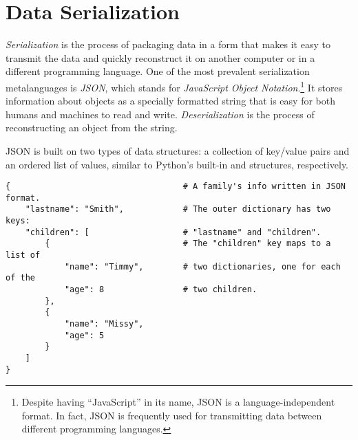 
\section*{Data Serialization} %

\emph{Serialization} is the process of packaging data in a form that makes it easy to transmit the data and quickly reconstruct it on another computer or in a different programming language.
One of the most prevalent serialization metalanguages is \emph{JSON}, which stands for \emph{JavaScript Object Notation}.\footnote{Despite having ``JavaScript'' in its name, JSON is a language-independent format. In fact, JSON is frequently used for transmitting data between different programming languages.}
It stores information about objects as a specially formatted string that is easy for both humans and machines to read and write.
\emph{Deserialization} is the process of reconstructing an object from the string.

JSON is built on two types of data structures: a collection of key/value pairs and an ordered list of values, similar to Python's built-in  and  structures, respectively.
%
\begin{lstlisting}
{                                   # A family's info written in JSON format.
    "lastname": "Smith",            # The outer dictionary has two keys:
    "children": [                   # "lastname" and "children".
        {                           # The "children" key maps to a list of
            "name": "Timmy",        # two dictionaries, one for each of the
            "age": 8                # two children.
        },
        {
            "name": "Missy",
            "age": 5
        }
    ]
}
\end{lstlisting}

